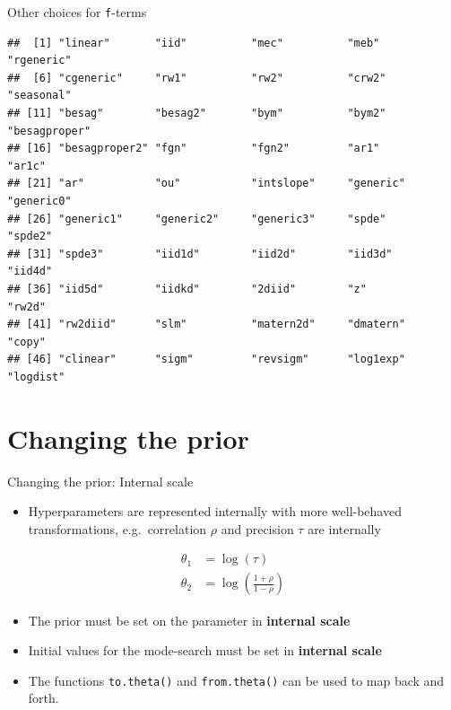 \documentclass[
  ignorenonframetext,
]{beamer}
\providecommand{\tightlist}{%
  \setlength{\itemsep}{0pt}\setlength{\parskip}{0pt}}
\begin{document}
\begin{frame}[fragile]{Other choices for \texttt{f}-terms}
\protect\hypertarget{other-choices-for-f-terms}{}
\small

\begin{verbatim}
##  [1] "linear"       "iid"          "mec"          "meb"          "rgeneric"    
##  [6] "cgeneric"     "rw1"          "rw2"          "crw2"         "seasonal"    
## [11] "besag"        "besag2"       "bym"          "bym2"         "besagproper" 
## [16] "besagproper2" "fgn"          "fgn2"         "ar1"          "ar1c"        
## [21] "ar"           "ou"           "intslope"     "generic"      "generic0"    
## [26] "generic1"     "generic2"     "generic3"     "spde"         "spde2"       
## [31] "spde3"        "iid1d"        "iid2d"        "iid3d"        "iid4d"       
## [36] "iid5d"        "iidkd"        "2diid"        "z"            "rw2d"        
## [41] "rw2diid"      "slm"          "matern2d"     "dmatern"      "copy"        
## [46] "clinear"      "sigm"         "revsigm"      "log1exp"      "logdist"
\end{verbatim}
\end{frame}

\hypertarget{changing-the-prior}{%
\section{Changing the prior}\label{changing-the-prior}}

\begin{frame}[fragile]{Changing the prior: Internal scale}
\protect\hypertarget{changing-the-prior-internal-scale}{}
\begin{itemize}
\tightlist
\item
  Hyperparameters are represented internally with more well-behaved
  transformations, e.g.~correlation \(\rho\) and precision \(\tau\) are
  internally
\end{itemize}

\[
\begin{aligned}
  \theta_1 &= \log(\tau)\\
    \theta_2 &= \log\left(\frac{1+\rho}{1-\rho}\right)
\end{aligned}
\]

\begin{itemize}
\item
  The prior must be set on the parameter in \textbf{internal scale}
\item
  Initial values for the mode-search must be set in \textbf{internal
  scale}
\item
  The functions \texttt{to.theta()} and \texttt{from.theta()} can be
  used to map back and forth.
\end{itemize}
\end{frame}
\end{document}
